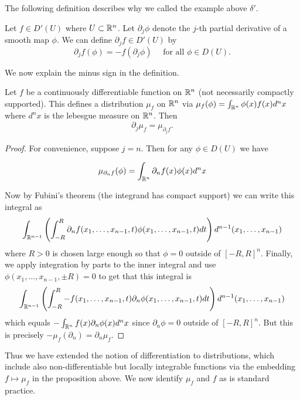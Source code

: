 \documentclass[twoside, a4paper, 10pt]{amsart}
\begin{document}
The following definition describes why we called the example above $\delta'$.

\begin{mydef} Let $f \in D'(U)$ where $U \subset \mathbb{R}^n$. Let $\partial_j \phi$ denote the $j$-th partial derivative of a smooth map $\phi$. We can define $\partial_j f \in D'(U)$ by $$\partial_j f (\phi) = - f(\partial_j \phi) \quad \text{ for all } \phi \in D(U).$$ 

\end{mydef}

We now explain the minus sign in the definition.

\begin{prop} Let $f$ be a continuously differentiable function on $\mathbb{R}^n$ (not necessarily compactly supported). This defines a distribution $\mu_f$ on $\mathbb{R}^n$ via $\mu_f (\phi) = \int_{\mathbb{R}^n} \phi(x) f(x) d^n x$ where $d^n x$ is the lebesgue measure on $\mathbb{R}^n$. Then $$\partial_j \mu_f = \mu_{\partial_j f}.$$

\end{prop}

\begin{proof} For convenience, suppose $j = n$. Then for any $\phi \in D(U)$ we have 

$$ \mu_{\partial_n f} (\phi) = \int_{\mathbb{R}^n} \partial_n f(x) \phi (x) d^n x $$

Now by Fubini's theorem (the integrand has compact support) we can write this integral as $$ \int_{\mathbb{R}^{n-1}} \left(\int_{-R}^{R} \partial_n f(x_1, \ldots, x_{n-1}, t) \phi (x_1, \ldots, x_{n-1}, t)  dt \right) d^{n-1}(x_1, \ldots, x_{n-1})$$ where $R > 0$ is chosen large enough so that $\phi = 0$ outside of $[-R,R]^n$. Finally, we apply integration by parts to the inner integral and use $\phi(x_1, \ldots, x_{n-1}, \pm R) = 0$ to get that this integral is $$\int_{\mathbb{R}^{n-1}} \left(\int_{-R}^{R} - f(x_1, \ldots, x_{n-1}, t) \partial_n \phi (x_1, \ldots, x_{n-1}, t)  dt \right) d^{n-1}(x_1, \ldots, x_{n-1})$$ which equals $- \int_{\mathbb{R}^n} f(x) \partial_n \phi(x) d^n x$ since $\partial_n \phi = 0$ outside of $[-R,R]^n$.  But this is precisely $-\mu_f(\partial_n) = \partial_n \mu_f$. \end{proof}

Thus we have extended the notion of differentiation to distributions, which include also non-differentiable but locally integrable functions via the embedding $f \mapsto \mu_f$ in the proposition above. We now identify $\mu_f$ and $f$ as is standard practice. 
\end{document}
